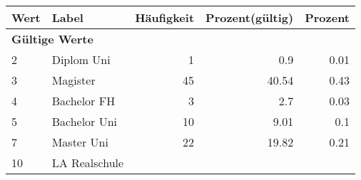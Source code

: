      \begin{longtable}{lXrrr}
     \toprule
     \textbf{Wert} & \textbf{Label} & \textbf{Häufigkeit} & \textbf{Prozent(gültig)} & \textbf{Prozent} \\
     \endhead
     \midrule
     \multicolumn{5}{l}{\textbf{Gültige Werte}}\\

     2 &
     \multicolumn{1}{X}{ Diplom Uni   } &


       \num{1} &
       \num[round-mode=places,round-precision=2]{0.9} &
         \num[round-mode=places,round-precision=2]{0.01} \\

     3 &
     \multicolumn{1}{X}{ Magister   } &


       \num{45} &
       \num[round-mode=places,round-precision=2]{40.54} &
         \num[round-mode=places,round-precision=2]{0.43} \\

     4 &
     \multicolumn{1}{X}{ Bachelor FH   } &


       \num{3} &
       \num[round-mode=places,round-precision=2]{2.7} &
         \num[round-mode=places,round-precision=2]{0.03} \\

     5 &
     \multicolumn{1}{X}{ Bachelor Uni   } &


       \num{10} &
       \num[round-mode=places,round-precision=2]{9.01} &
         \num[round-mode=places,round-precision=2]{0.1} \\

     7 &
     \multicolumn{1}{X}{ Master Uni   } &


       \num{22} &
       \num[round-mode=places,round-precision=2]{19.82} &
         \num[round-mode=places,round-precision=2]{0.21} \\

     10 &
     \multicolumn{1}{X}{ LA Realschule   } &



\end{longtable}
